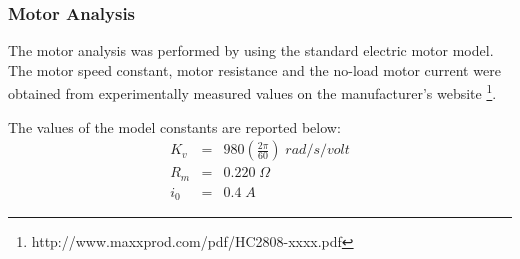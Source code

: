 \documentclass[11pt]{article}
\begin{document}
\subsubsection{Motor Analysis}
The motor analysis was performed by using the standard electric motor model. The motor speed constant, motor resistance and the no-load motor current were obtained from experimentally measured values on the manufacturer's website \footnote{http://www.maxxprod.com/pdf/HC2808-xxxx.pdf}.

The values of the model constants are reported below:
\begin{eqnarray*}
K_v &=& 980 \left( \frac{2 \pi}{60} \right) \; rad/s/volt \\
R_m &=& 0.220 \; \Omega \\
i_0 &=& 0.4 \; A
\end{eqnarray*}
\end{document}
